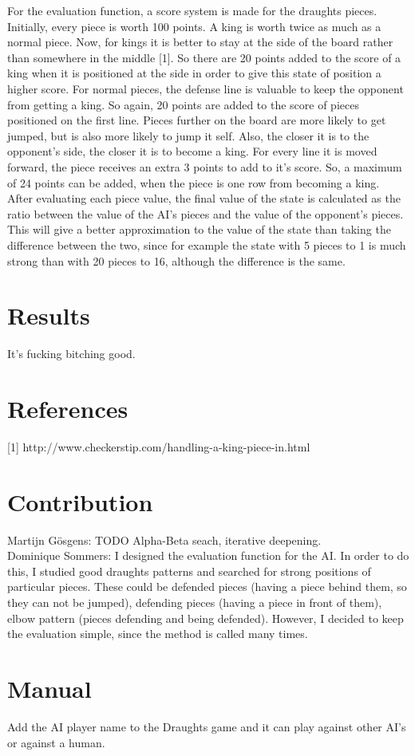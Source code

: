 \documentclass[a4paper,twoside,11pt]{article}
\begin{document}
For the evaluation function, a score system is made for the draughts pieces. Initially, every piece is worth 100 points. A king is worth twice as much as a normal piece. Now, for kings it is better to stay at the side of the board rather than somewhere in the middle [1]. So there are 20 points added to the score of a king when it is positioned at the side in order to give this state of position a higher score.
For normal pieces, the defense line is valuable to keep the opponent from getting a king. So again, 20 points are added to the score of pieces positioned on the first line. Pieces further on the board are more likely to get jumped, but is also more likely to jump it self. Also, the closer it is to the opponent's side, the closer it is to become a king. For every line it is moved forward, the piece receives an extra 3 points to add to it's score. So, a maximum of 24 points can be added, when the piece is one row from becoming a king.\\
After evaluating each piece value, the final value of the state is calculated as the ratio between the value of the AI's pieces and the value of the opponent's pieces. This will give a better approximation to the value of the state than taking the difference between the two, since for example the state with 5 pieces to 1 is much strong than with 20 pieces to 16, although the difference is the same. 

\section{Results}
It's fucking bitching good.

\section{References}
[1] http://www.checkerstip.com/handling-a-king-piece-in.html

\section{Contribution}
Martijn Gösgens: TODO Alpha-Beta seach, iterative deepening. \\
Dominique Sommers: I designed the evaluation function for the AI. In order to do this, I studied good draughts patterns and searched for strong positions of particular pieces. These could be defended pieces (having a piece behind them, so they can not be jumped), defending pieces (having a piece in front of them), elbow pattern (pieces defending and being defended). However, I decided to keep the evaluation simple, since the method is called many times.

\section{Manual}
Add the AI player name to the Draughts game and it can play against other AI's or against a human.
\end{document}
